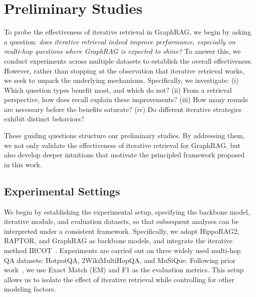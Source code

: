 \documentclass{article} %
\begin{document}
\section{Preliminary Studies}
\label{Preliminary}

To probe the effectiveness of iterative retrieval in GraphRAG, we begin by asking a  question: 
{\it does iterative retrieval indeed improve performance, especially on multi-hop questions where GraphRAG is expected to shine?} 
To answer this, we conduct experiments across multiple datasets to establish the overall effectiveness. 
However, rather than stopping at the observation that iterative retrieval works, we seek to unpack the underlying mechanisms. 
Specifically, we investigate: (i) Which question types benefit most, and which do not? (ii) From a retrieval perspective, how does recall explain these improvements? (iii) How many rounds are necessary before the benefits saturate? (iv) Do different iterative strategies exhibit distinct behaviors?  

These guiding questions structure our preliminary studies. By addressing them, we not only validate the effectiveness of iterative retrieval for GraphRAG, but also develop deeper intuitions that motivate the principled framework proposed in this work.


\subsection{Experimental Settings}
\label{sec:experment}
We begin by establishing the experimental setup, specifying the backbone model, iterative module, and evaluation datasets, so that subsequent analyses can be interpreted under a consistent framework.
Specifically, we adopt HippoRAG2, RAPTOR, and GraphRAG as backbone models, and integrate the iterative method IRCOT~\citep{trivedi2022interleaving}. Experiments are carried out on three widely used multi-hop QA datasets: HotpotQA, 2WikiMultiHopQA, and MuSiQue. Following prior work~\citep{gutierrez2025rag}, we use Exact Match (EM) and F1 as the evaluation metrics. This setup allows us to isolate the effect of iterative retrieval while controlling for other modeling factors.
\end{document}
